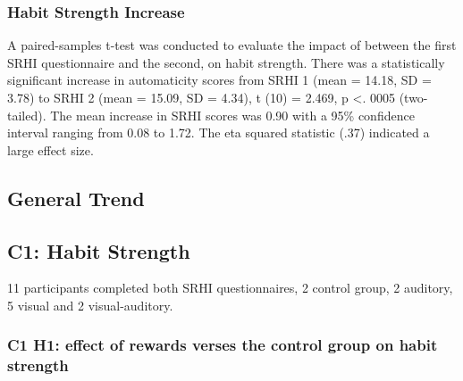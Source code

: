 \documentclass{scaffold/sigchi}
\begin{document}
\subsubsection{Habit Strength Increase}
A paired-samples t-test was conducted to evaluate the impact of between the first SRHI questionnaire and the second, on habit strength. There was a statistically
significant increase in automaticity scores from SRHI 1 (mean = 14.18, SD = 3.78) to SRHI 2
(mean = 15.09, SD = 4.34), t (10) = 2.469, p <. 0005 (two-tailed). The mean increase in
SRHI scores was 0.90 with a 95\% confidence interval ranging from 0.08 to 1.72.
The eta squared statistic (.37) indicated a large effect size.


\subsection{General Trend}



\subsection{C1: Habit Strength}

11 participants completed both SRHI questionnaires, 2 control group, 2 auditory, 5 visual and 2 visual-auditory.

\subsubsection{C1 H1: effect of rewards verses the control group on habit strength}

\end{document}
